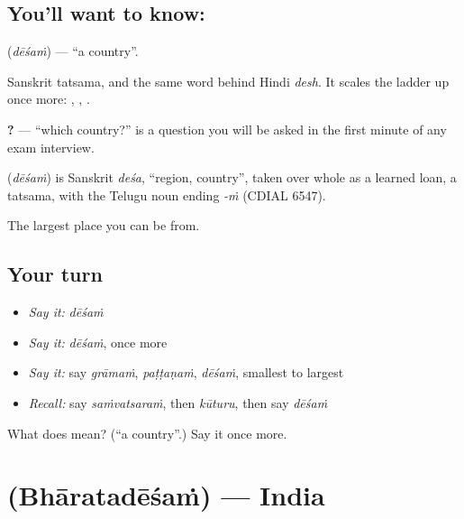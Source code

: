\subsection*{You'll want to know: }
\textbf{} (\emph{dēśaṁ}) — \textquotedblleft{}a country\textquotedblright{}.

Sanskrit tatsama, and the same word behind Hindi \emph{desh}. It scales the ladder up once more: , , .

\textbf{ ?} — \textquotedblleft{}which country?\textquotedblright{} is a question you will be asked in the first minute of any exam interview.

\begin{cousinweb}
\textbf{} (\emph{dēśaṁ}) is Sanskrit \emph{deśa}, \textquotedblleft{}region, country\textquotedblright{}, taken over whole as a learned loan, a tatsama, with the Telugu noun ending \emph{-ṁ} (CDIAL 6547).
\end{cousinweb}

\begin{grammarlens}[title={What you've built}]
The largest place you can be from.
\end{grammarlens}

\subsection*{Your turn}
\begin{itemize}
\raggedright
  \item \emph{Say it:} \emph{dēśaṁ}
  \item \emph{Say it:} \emph{dēśaṁ}, once more
  \item \emph{Say it:} say \emph{grāmaṁ}, \emph{paṭṭaṇaṁ}, \emph{dēśaṁ}, smallest to largest
  \item \emph{Recall:} say \emph{saṁvatsaraṁ}, then \emph{kūturu}, then say \emph{dēśaṁ}
\end{itemize}

\begin{tcolorbox}[breakable,colback=teal!4,colframe=teal!35!black,title={Before you move on}]
What does  mean? (\textquotedblleft{}a country\textquotedblright{}.) Say it once more.
\end{tcolorbox}
\section[\texorpdfstring{\te{భారతదేశం} (Bhāratadēśaṁ)}{భారతదేశం (Bhāratadēśaṁ)}]{ (Bhāratadēśaṁ) — India}


